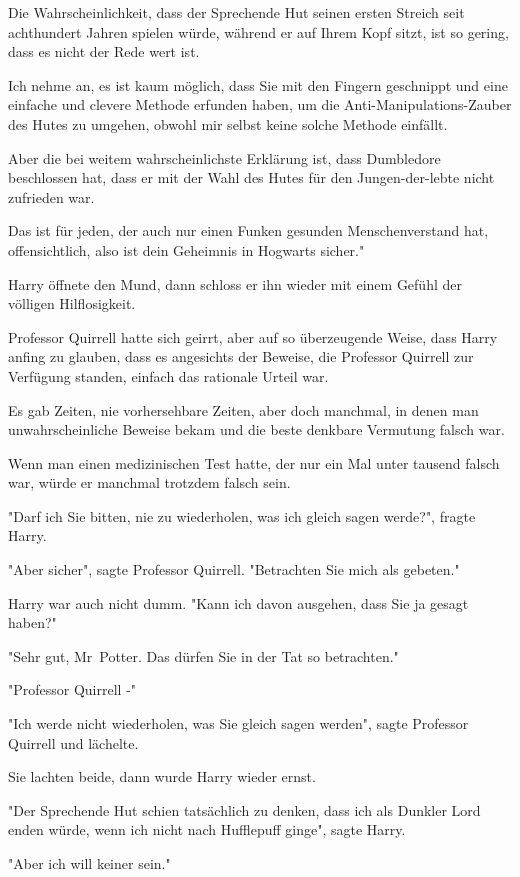{Die Wahrscheinlichkeit, dass der Sprechende Hut seinen ersten Streich seit achthundert Jahren spielen würde, während er auf Ihrem Kopf sitzt, ist so gering, dass es nicht der Rede wert ist.

Ich nehme an, es ist kaum möglich, dass Sie mit den Fingern geschnippt und eine einfache und clevere Methode erfunden haben, um die Anti-Manipulations-Zauber des Hutes zu umgehen, obwohl mir selbst keine solche Methode einfällt.

Aber die bei weitem wahrscheinlichste Erklärung ist, dass Dumbledore beschlossen hat, dass er mit der Wahl des Hutes für den Jungen-der-lebte nicht zufrieden war.

Das ist für jeden, der auch nur einen Funken gesunden Menschenverstand hat, offensichtlich, also ist dein Geheimnis in Hogwarts sicher."

Harry öffnete den Mund, dann schloss er ihn wieder mit einem Gefühl der völligen Hilflosigkeit.

Professor Quirrell hatte sich geirrt, aber auf so überzeugende Weise, dass Harry anfing zu glauben, dass es angesichts der Beweise, die Professor Quirrell zur Verfügung standen, einfach das rationale Urteil war.

Es gab Zeiten, nie vorhersehbare Zeiten, aber doch manchmal, in denen man unwahrscheinliche Beweise bekam und die beste denkbare Vermutung falsch war.

Wenn man einen medizinischen Test hatte, der nur ein Mal unter tausend falsch war, würde er manchmal trotzdem falsch sein.

"Darf ich Sie bitten, nie zu wiederholen, was ich gleich sagen werde?", fragte Harry.

"Aber sicher", sagte Professor Quirrell. "Betrachten Sie mich als gebeten."

Harry war auch nicht dumm. "Kann ich davon ausgehen, dass Sie ja gesagt haben?"

"Sehr gut, Mr~Potter. Das dürfen Sie in der Tat so betrachten."

"Professor Quirrell -"

"Ich werde nicht wiederholen, was Sie gleich sagen werden", sagte Professor Quirrell und lächelte.

Sie lachten beide, dann wurde Harry wieder ernst.

"Der Sprechende Hut schien tatsächlich zu denken, dass ich als Dunkler Lord enden würde, wenn ich nicht nach Hufflepuff ginge", sagte Harry.

"Aber ich will keiner sein."

}
